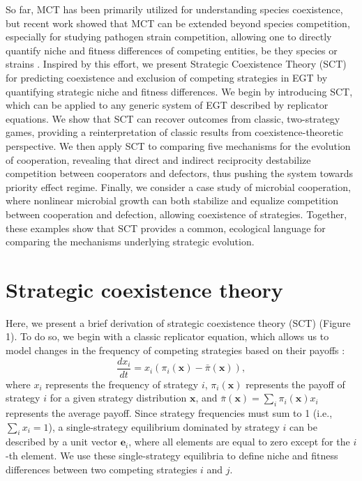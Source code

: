 \documentclass[12pt]{article}
\begin{document}
So far, MCT has been primarily utilized for understanding species coexistence, but recent work showed that MCT can be extended beyond species competition, especially for studying pathogen strain competition, allowing one to directly quantify niche and fitness differences of competing entities, be they species or strains \citep{sieben2022quantifying,park2024predicting,park2026unifying}.
Inspired by this effort, we present Strategic Coexistence Theory (SCT) for predicting coexistence and exclusion of competing strategies in EGT by quantifying strategic niche and fitness differences.
We begin by introducing SCT, which can be applied to any generic system of EGT described by replicator equations.
We show that SCT can recover outcomes from classic, two-strategy games, providing a reinterpretation of classic results from coexistence-theoretic perspective.
We then apply SCT to comparing five mechanisms for the evolution of cooperation, revealing that direct and indirect reciprocity destabilize competition between cooperators and defectors, thus pushing the system towards priority effect regime. 
Finally, we consider a case study of microbial cooperation, where nonlinear microbial growth can both stabilize and equalize competition between cooperation and defection, allowing coexistence of strategies.
Together, these examples show that SCT provides a common, ecological language for comparing the mechanisms underlying strategic evolution.

\section*{Strategic coexistence theory}

Here, we present a brief derivation of strategic coexistence theory (SCT) (Figure 1).
To do so, we begin with a classic replicator equation, which allows us to model changes in the frequency of competing strategies based on their payoffs \citep{schuster1983replicator,hofbauer1998evolutionary,cressman2003evolutionary,cressman2014replicator}:
\begin{equation}
\frac{dx_i}{dt} = x_i (\pi_i(\mathbf{x}) - \bar{\pi}(\mathbf{x})),
\end{equation}
where $x_i$ represents the frequency of strategy $i$, $\pi_i(\mathbf{x})$ represents the payoff of strategy $i$ for a given strategy distribution $\mathbf{x}$, and $\bar{\pi}(\mathbf{x}) = \sum_i \pi_i(\mathbf{x}) x_i$ represents the average payoff. Since strategy frequencies must sum to 1 (i.e., $\sum_i x_i = 1$), a single-strategy equilibrium dominated by strategy $i$ can be described by a unit vector $\mathbf{e}_i$, where all elements are equal to zero except for the $i$-th element. 
We use these single-strategy equilibria to define niche and fitness differences between two competing strategies $i$ and $j$. 
\end{document}
